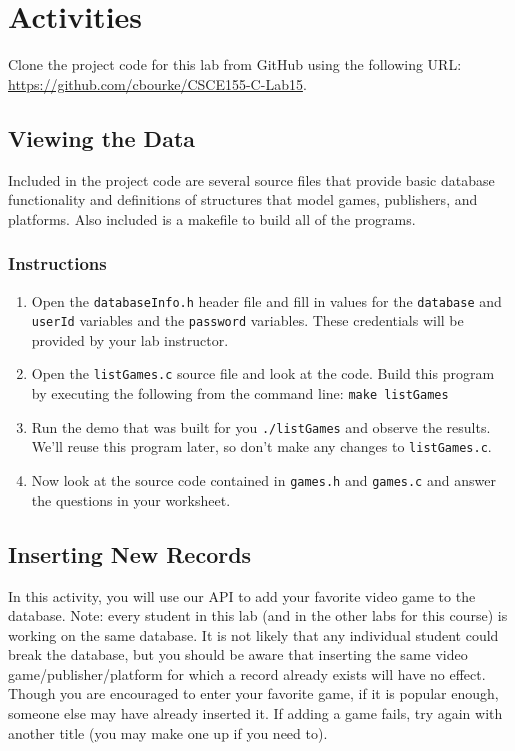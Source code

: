 \documentclass[12pt]{scrartcl}
\begin{document}
\section{Activities}

Clone the project code for this lab from GitHub using the following
URL: \url{https://github.com/cbourke/CSCE155-C-Lab15}.

\subsection{Viewing the Data}

Included in the project code are several source files that provide basic 
database functionality and definitions of structures that model games, 
publishers, and platforms.  Also included is a makefile to build all of the 
programs. 

\subsubsection*{Instructions}

\begin{enumerate}
  \item Open the \texttt{databaseInfo.h} header file and fill in values
  	for the \texttt{database} and \texttt{userId} variables and
	the \texttt{password} variables.  These
	credentials will be provided by your lab instructor.
  \item Open the \texttt{listGames.c} source file and look 
	at the code.  Build this program by executing the following from the 
	command line: \texttt{make listGames}
  \item Run the demo that was built for you \texttt{./listGames} 
  	and observe the results.  We'll reuse this program later, so don't 
	make any changes to \texttt{listGames.c}.
  \item Now look at the source code contained in \texttt{games.h} 
	and \texttt{games.c} and answer the questions in your worksheet.
\end{enumerate}

\subsection{Inserting New Records}

In this activity, you will use our API to add your favorite video game to 
the database.  Note: every student in this lab (and in the other labs for 
this course) is working on the same database.  It is not likely that any 
individual student could break the database, but you should be aware 
that inserting the same video game/publisher/platform for which a 
record already exists will have no effect.  Though you are encouraged 
to enter your favorite game, if it is popular enough, someone else may 
have already inserted it.  If adding a game fails, try again with another 
title (you may make one up if you need to).
\end{document}
